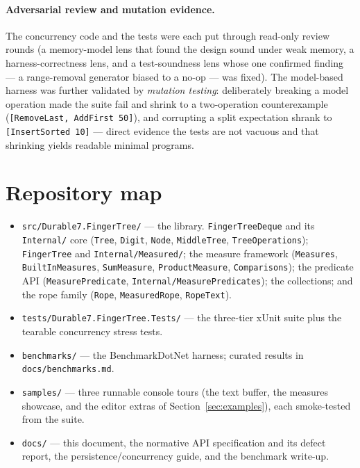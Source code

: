 \documentclass[11pt]{article}
\newcommand{\cs}[1]{\lstinline|#1|}
\begin{document}
\paragraph{Adversarial review and mutation evidence.} The concurrency code and the tests were each put
through read-only review rounds (a memory-model lens that found the design sound under weak memory, a
harness-correctness lens, and a test-soundness lens whose one confirmed finding --- a range-removal
generator biased to a no-op --- was fixed). The model-based harness was further validated by
\emph{mutation testing}: deliberately breaking a model operation made the suite fail and shrink to a
two-operation counterexample (\cs{[RemoveLast, AddFirst 50]}), and corrupting a split expectation shrank
to \cs{[InsertSorted 10]} --- direct evidence the tests are not vacuous and that shrinking yields
readable minimal programs.

\section{Repository map}
\label{sec:map}

\begin{itemize}[leftmargin=1.4em, itemsep=1pt]
  \item \texttt{src/Durable7.FingerTree/} --- the library. \cs{FingerTreeDeque} and its
    \texttt{Internal/} core (\cs{Tree}, \cs{Digit}, \cs{Node}, \cs{MiddleTree}, \cs{TreeOperations});
    \cs{FingerTree} and \texttt{Internal/Measured/}; the measure framework (\cs{Measures},
    \cs{BuiltInMeasures}, \cs{SumMeasure}, \cs{ProductMeasure}, \cs{Comparisons}); the predicate API
    (\cs{MeasurePredicate}, \cs{Internal/MeasurePredicates}); the collections; and the rope family
    (\cs{Rope}, \cs{MeasuredRope}, \cs{RopeText}).
  \item \texttt{tests/Durable7.FingerTree.Tests/} --- the three-tier xUnit suite plus the
    tearable concurrency stress tests.
  \item \texttt{benchmarks/} --- the BenchmarkDotNet harness; curated results in
    \texttt{docs/benchmarks.md}.
  \item \texttt{samples/} --- three runnable console tours (the text buffer, the measures showcase, and the
    editor extras of Section~\ref{sec:examples}), each smoke-tested from the suite.
  \item \texttt{docs/} --- this document, the normative API specification and its defect report, the
    persistence/concurrency guide, and the benchmark write-up.
\end{itemize}
\end{document}
